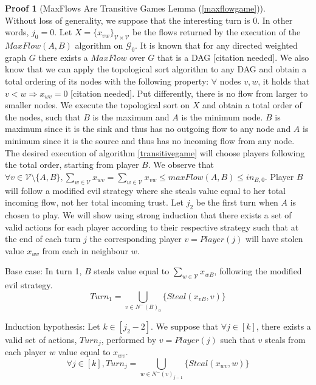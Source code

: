 \documentclass[11pt]{llncs}
\theoremstyle{definition}
\newtheorem{sepproof}{Proof}
\begin{document}
    \begin{sepproof}[MaxFlows Are Transitive Games Lemma (\ref{maxflowgame})] \ \\
    \label{maxflowgameproof}
       Without loss of generality, we suppose that the interesting turn is 0. In other words, $j_0 = 0$. Let $X =
       \{x_{vw}\}_{\mathcal{V} \times \mathcal{V}}$ be the flows returned by the execution of the $MaxFlow\left(A, B\right)$
       algorithm on $\mathcal{G}_0$. It is known that for any directed weighted graph $G$ there exists a $MaxFlow$ over $G$
       that is a DAG [citation needed]. We also know that we can apply the topological sort algorithm to any DAG and obtain a
       total ordering of its nodes with the following property: $\forall$ nodes $v, w$, it holds that
       $v < w \Rightarrow x_{wv} = 0$ [citation needed]. Put differently, there is no flow from larger to smaller nodes. We
       execute the topological sort on $X$ and obtain a total order of the nodes, such that $B$ is the maximum and
       $A$ is the minimum node. $B$ is maximum since it is the sink and thus has no outgoing flow to any node and $A$ is
       minimum since it is the source and thus has no incoming flow from any node. The desired execution of algorithm
       \ref{transitivegame} will choose players following the total order, starting from player $B$. We observe that
       $\forall v \in \mathcal{V} \setminus \{A, B\}, \sum\limits_{w \in \mathcal{V}}x_{wv} = \sum\limits_{w \in
       \mathcal{V}}x_{vw} \leq maxFlow\left(A, B\right) \leq in_{B, 0}$. Player $B$ will follow a modified evil strategy
       where she steals value equal to her total incoming flow, not her total incoming trust. Let $j_2$ be the first turn
       when $A$ is chosen to play. We will show using strong induction that there exists a set of valid actions for each
       player according to their respective strategy such that at the end of each turn $j$ the corresponding player $v =
       Player\left(j\right)$ will have stolen value $x_{wv}$ from each in neighbour $w$.

       Base case: In turn 1, $B$ steals value equal to $\sum\limits_{w \in \mathcal{V}}x_{wB}$, following the modified evil
       strategy.
       \begin{equation}
          Turn_1 = \bigcup\limits_{v \in N^{-}\left(B\right)_0}\{Steal\left(x_{vB}, v\right)\}
       \end{equation}

       Induction hypothesis: Let $k \in [j_2 - 2]$. We suppose that $\forall j \in [k]$, there exists a valid set of actions,
       $Turn_j$, performed by $v = Player\left(j\right)$ such that $v$ steals from each player $w$ value equal to $x_{wv}$.
       \begin{equation}
          \forall j \in [k], Turn_j = \bigcup\limits_{w \in N^{-}\left(v\right)_{j-1}}\{Steal\left(x_{wv}, w\right)\}
       \end{equation}


\end{sepproof}
\end{document}
